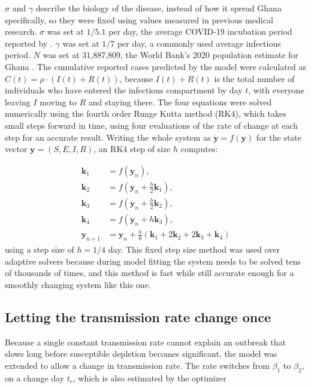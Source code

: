 \documentclass[journal]{IEEEtran}
\begin{document}
$\sigma$ and $\gamma$ describe the biology of the disease, instead of how it spread Ghana specifically, so they were fixed using values measured in previous medical research. $\sigma$ was set at $1/5.1$ per day, the average COVID-19 incubation period reported by \cite{lauer2020}. $\gamma$ was set at $1/7$ per day, a commonly used average infectious period. $N$ was set at 31,887,809, the World Bank's 2020 population estimate for Ghana \cite{worldbank2020}. The cumulative reported cases predicted by the model were calculated as $C(t) = \rho \cdot (I(t) + R(t))$, because $I(t) + R(t)$ is the total number of individuals who have entered the infectious compartment by day $t$, with everyone leaving $I$ moving to $R$ and staying there. The four equations were solved numerically using the fourth order Runge Kutta method (RK4), which takes small steps forward in time, using four evaluations of the rate of change at each step for an accurate result. Writing the whole system as $\dot{\mathbf{y}} = f(\mathbf{y})$ for the state vector $\mathbf{y} = (S,E,I,R)$, an RK4 step of size $h$ computes:

\begin{align}
\mathbf{k}_1 &= f(\mathbf{y}_n), \\
\mathbf{k}_2 &= f\!\left(\mathbf{y}_n + \tfrac{h}{2}\mathbf{k}_1\right), \\
\mathbf{k}_3 &= f\!\left(\mathbf{y}_n + \tfrac{h}{2}\mathbf{k}_2\right), \\
\mathbf{k}_4 &= f\!\left(\mathbf{y}_n + h\mathbf{k}_3\right), \\ \mathbf{y}_{n+1} &= \mathbf{y}_n + \frac{h} {6}\left(\mathbf{k}_1 + 2\mathbf{k}_2 + 2\mathbf{k}_3 + \mathbf{k}_4\right)
\end{align}
using a step size of $h = 1/4$ day. This fixed step size method was used over adaptive solvers because during model fitting the system needs to be solved tens of thousands of times, and this method is fast while still accurate enough for a smoothly changing system like this one.

\subsection{Letting the transmission rate change once}

Because a single constant transmission rate cannot explain an outbreak that slows long before susceptible depletion becomes significant, the model was extended to allow a change in transmission rate. The rate switches from $\beta_1$ to $\beta_2$, on a change day $t_c$, which is also estimated by the optimizer
\end{document}
